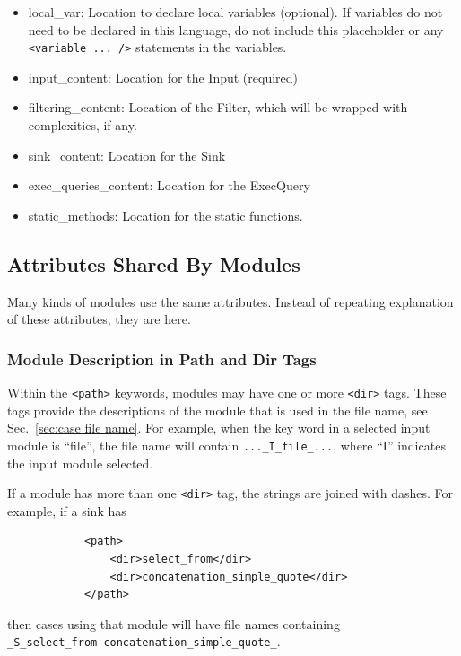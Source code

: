 \documentclass[12pt]{article}
\begin{document}
\begin{itemize}
\begin{itemize}
        \item local\_var: Location to declare local variables (optional).  If
          variables do not need to be declared in this language, do not include this
          placeholder or any \verb|<variable ... />| statements in the variables.

        \item input\_content:  Location for the Input (required)

        \item filtering\_content: Location of the Filter, which will be wrapped with
          complexities, if any.

        \item sink\_content:  Location for the Sink

        \item exec\_queries\_content:  Location for the ExecQuery

        \item static\_methods:  Location for the static functions.
    \end{itemize}
\end{itemize}


\subsection{Attributes Shared By Modules}
\label{sec:shared attributes}

Many kinds of modules use the same attributes.  Instead of repeating explanation of
these attributes, they are here.

\subsubsection{Module Description in Path and Dir Tags}
\label{sec:module description}

Within the \verb|<path>| keywords, modules may have one or more \verb|<dir>| tags.
These tags provide the descriptions of the module that is used in the file name, see
Sec.~\ref{sec:case file name}.  For example, when the key word in a selected input
module is ``file'', the file name will contain \verb|..._I_file_...|, where ``I''
indicates the input module selected.

If a module has more than one \verb|<dir>| tag, the strings are joined with dashes.
For example, if a sink has
\begin{verbatim}
            <path>
                <dir>select_from</dir>
                <dir>concatenation_simple_quote</dir>
            </path>
\end{verbatim}
then cases using that module will have file names containing \\
\verb|_S_select_from-concatenation_simple_quote_|.
\end{document}
